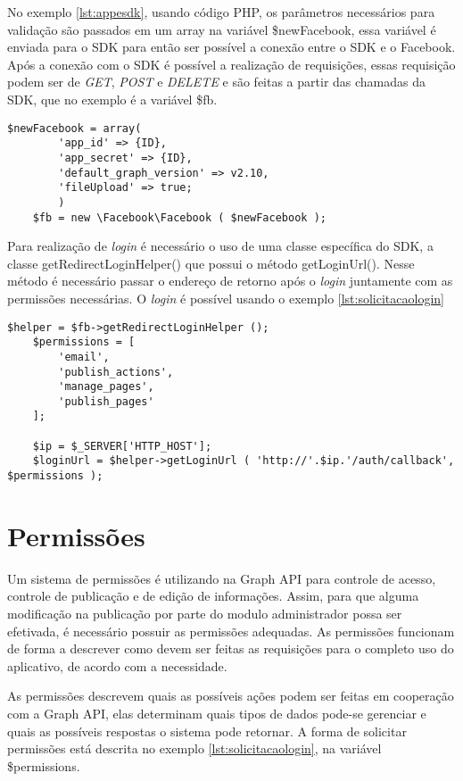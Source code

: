 No exemplo \ref{lst:appesdk}, usando código PHP, os parâmetros necessários para validação são passados em um array na variável \$newFacebook, essa variável é enviada para o SDK para então ser possível a conexão entre o SDK e o Facebook. Após a conexão com o SDK é possível a realização de requisições, essas requisição podem ser de \textit{GET}, \textit{POST} e \textit{DELETE} e são feitas a partir das chamadas da SDK, que no exemplo é a variável \$fb.

\begin{lstlisting}[caption={Conexão entre aplicativo e SDK},label={lst:appesdk}]
	$newFacebook = array(
		'app_id' => {ID},
		'app_secret' => {ID},
		'default_graph_version' => v2.10,
		'fileUpload' => true;
		)
	$fb = new \Facebook\Facebook ( $newFacebook );
\end{lstlisting}

Para realização de \textit{login} é necessário o uso de uma classe específica do SDK, a classe getRedirectLoginHelper() que possui o método getLoginUrl(). Nesse método é necessário passar o endereço de retorno após o \textit{login} juntamente com as permissões necessárias. O \textit{login} é possível usando o exemplo \ref{lst:solicitacaologin}

\begin{lstlisting}[caption={Solicitação de Login},label={lst:solicitacaologin}]
	$helper = $fb->getRedirectLoginHelper ();
	$permissions = [
		'email',
		'publish_actions',
		'manage_pages',
		'publish_pages'
	];

	$ip = $_SERVER['HTTP_HOST'];
	$loginUrl = $helper->getLoginUrl ( 'http://'.$ip.'/auth/callback', $permissions );
\end{lstlisting}

\section{Permissões}
\label{sec:permissoes}
Um sistema de permissões é utilizando na Graph API para controle de acesso, controle de publicação e de edição de informações. Assim, para que alguma modificação na publicação por parte do modulo administrador possa ser efetivada, é necessário possuir as permissões adequadas. As permissões funcionam de forma a descrever como devem ser feitas as requisições para o completo uso do aplicativo, de acordo com a necessidade.

As permissões descrevem quais as possíveis ações podem ser feitas em cooperação com a Graph API, elas determinam quais tipos de dados pode-se gerenciar e quais as possíveis respostas o sistema pode retornar. A forma de solicitar permissões está descrita no exemplo \ref{lst:solicitacaologin}, na variável \$permissions.

